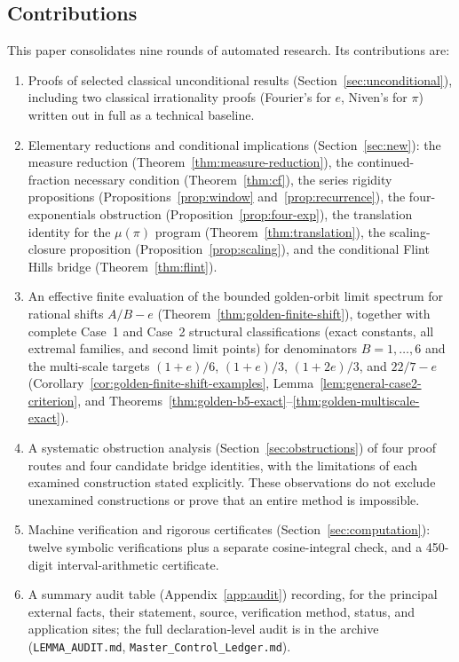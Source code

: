 \documentclass[11pt]{amsart}
\theoremstyle{definition}
\theoremstyle{remark}
\numberwithin{equation}{section}
\newcommand{\irr}{\mu}
\newcommand{\ee}{e}
\begin{document}
\subsection{Contributions} This paper consolidates nine rounds of automated research. Its contributions are:
\begin{enumerate}
\item Proofs of selected classical unconditional results (Section~\ref{sec:unconditional}), including two classical irrationality proofs (Fourier's for $\ee$, Niven's for $\pi$) written out in full as a technical baseline.
\item Elementary reductions and conditional implications (Section~\ref{sec:new}): the measure reduction (Theorem~\ref{thm:measure-reduction}), the continued-fraction necessary condition (Theorem~\ref{thm:cf}), the series rigidity propositions (Propositions~\ref{prop:window} and~\ref{prop:recurrence}), the four-exponentials obstruction (Proposition~\ref{prop:four-exp}), the translation identity for the $\irr(\pi)$ program (Theorem~\ref{thm:translation}), the scaling-closure proposition (Proposition~\ref{prop:scaling}), and the conditional Flint Hills bridge (Theorem~\ref{thm:flint}).
\item An effective finite evaluation of the bounded golden-orbit limit
spectrum for rational shifts $A/B-e$ (Theorem~\ref{thm:golden-finite-shift}),
together with complete Case~1 and Case~2 structural classifications
(exact constants, all extremal families, and second limit points) for
denominators $B=1,\dots,6$ and the multi-scale targets $(1+e)/6$,
$(1+e)/3$, $(1+2e)/3$, and $22/7-e$ (Corollary~\ref{cor:golden-finite-shift-examples},
Lemma~\ref{lem:general-case2-criterion}, and Theorems~\ref{thm:golden-b5-exact}--\ref{thm:golden-multiscale-exact}).
\item A systematic obstruction analysis (Section~\ref{sec:obstructions}) of four proof routes and four candidate bridge identities, with the limitations of each examined construction stated explicitly. These observations do not exclude unexamined constructions or prove that an entire method is impossible.
\item Machine verification and rigorous certificates (Section~\ref{sec:computation}): twelve symbolic verifications plus a separate cosine-integral check, and a 450-digit interval-arithmetic certificate.
\item A summary audit table (Appendix~\ref{app:audit}) recording, for the principal external facts, their statement, source, verification method, status, and application sites; the full declaration-level audit is in the archive (\texttt{LEMMA\_AUDIT.md}, \texttt{Master\_Control\_Ledger.md}).

\end{enumerate}
\end{document}
